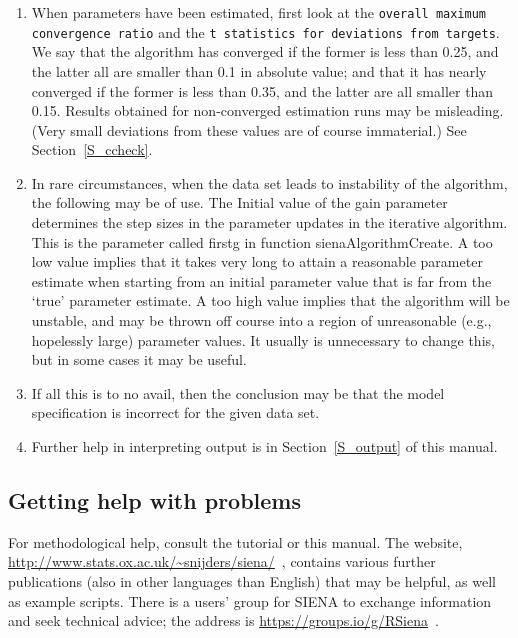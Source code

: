 \documentclass[a4paper,fleqn,11pt]{article}
\newcommand{\+}{\, + \,}
\newcommand{\SI}{{\sf SIENA }}
\begin{document}
\begin{enumerate}
      If Jaccard indices are low because the network is mainly increasing
      (creation of new ties) or decreasing (termination of ties),
      this is no problem for the \SI method. Very sparse networks
      (with most degrees less than 2) also may have lower Jaccard values
      without negative consequences for estimation.
\item When parameters have been estimated, first look at the
     \texttt{overall maximum \\convergence ratio} and the \texttt{t statistics for deviations
      from targets}.
      We say that the algorithm has converged if the former is less than 0.25,
      and the latter all are smaller than 0.1 in absolute value;
      and that it has nearly converged if the former is less than 0.35, and the latter are all
      smaller than 0.15. Results obtained for non-converged estimation
      runs may be misleading. (Very small deviations from these
      values are of course immaterial.) See Section~\ref{S_ccheck}.
\item In rare circumstances, when the data set leads to instability
      of the algorithm, the following may be of use.
      The \textsf{Initial value of the gain parameter} determines the
      step sizes in the parameter updates in the iterative
      algorithm.
      This is the parameter called \textsf{firstg}
      in function \textsf{sienaAlgorithmCreate}.
      A too low value implies that it takes very long to attain a
      reasonable parameter estimate when starting from an initial
      parameter value that is far from the `true' parameter estimate.
      A too high value implies that the algorithm will be unstable,
      and may be thrown off course into a region of unreasonable
      (e.g., hopelessly large) parameter values. It usually is unnecessary
      to change this, but in some cases it may be useful.
\item If all this is to no avail, then the conclusion may be that the model
      specification is incorrect for the given data set.
\item Further help in interpreting output is in Section~\ref{S_output} of
      this manual.
\end{enumerate}


\subsection{Getting help with problems}
\label{sec:problems}

For methodological help, consult the tutorial  \citet{SnijdersEA10b} or this manual.
The website, {\small\url{http://www.stats.ox.ac.uk/~snijders/siena/}~}, contains
various further publications (also in other languages than English) that may
be helpful, as well as example scripts.
There is a users' group for \SI to exchange information and seek technical
advice; the address is {\small\url{https://groups.io/g/RSiena}~}.
\end{document}
